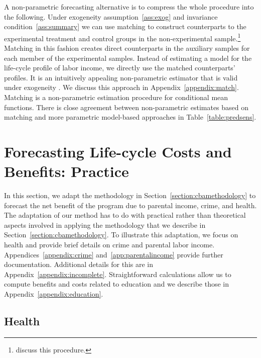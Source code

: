 A non-parametric forecasting alternative is to compress the whole procedure into the following. Under exogeneity assumption~\ref{ass:exog} and invariance condition~\ref{ass:summary} we can use matching to construct counterparts to the experimental treatment and control groups in the non-experimental sample.\footnote{\citet{Heckman_Ichimura_etal_1998_Econometrica} discuss this procedure.} Matching in this fashion creates direct counterparts in the auxiliary samples for each member of the experimental samples. Instead of estimating a model for the life-cycle profile of labor income, we directly use the matched counterparts' profiles. It is an intuitively appealing non-parametric estimator that is valid under exogeneity \citep{Heckman_Navarro_2004_REStat}. We discuss this approach in Appendix~\ref{appendix:match}. Matching is a non-parametric estimation procedure for conditional mean functions. There is close agreement between non-parametric estimates based on matching and more parametric model-based approaches in Table~\ref{table:predsens}.

\section{Forecasting Life-cycle Costs and Benefits: Practice} \label{section:cbapractice}

In this section, we adapt the methodology in Section~\ref{section:cbamethodology} to forecast the net benefit of the program due to parental income, crime, and health. The adaptation of our method has to do with practical rather than theoretical aspects involved in applying the methodology that we describe in Section~\ref{section:cbamethodology}. To illustrate this adaptation, we focus on health and provide brief details on crime and parental labor income. Appendices~\ref{appendix:crime} and~\ref{app:parentalincome} provide further documentation. Additional details for this are in Appendix~\ref{appendix:incomplete}. Straightforward calculations allow us to compute benefits and costs related to education and we describe those in Appendix~\ref{appendix:education}.

\subsection{Health}

